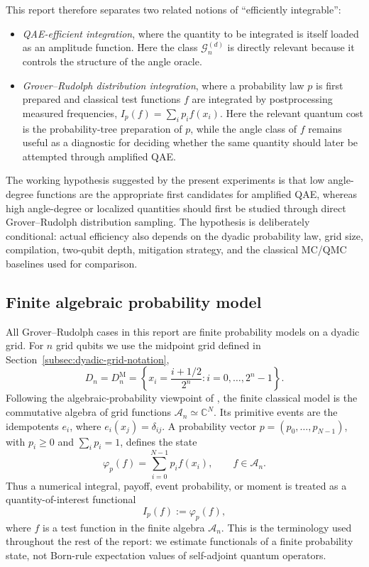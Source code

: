 This report therefore separates two related notions of ``efficiently
integrable'':
\begin{itemize}[leftmargin=*]
  \item \emph{QAE-efficient integration}, where the quantity to be integrated
        is itself loaded as an amplitude function. Here the class
        \(\mathcal{G}^{(d)}_n\) is directly relevant because it controls the
        structure of the angle oracle.
  \item \emph{Grover--Rudolph distribution integration}, where a probability
        law \(p\) is first prepared and classical test functions \(f\) are
        integrated by postprocessing measured frequencies,
        \(I_p(f)=\sum_i p_i f(x_i)\). Here the relevant quantum cost is the
        probability-tree preparation of \(p\), while the angle class of \(f\)
        remains useful as a diagnostic for deciding whether the same quantity
        should later be attempted through amplified QAE.
\end{itemize}

The working hypothesis suggested by the present experiments is that low
angle-degree functions are the appropriate first candidates for amplified QAE,
whereas high angle-degree or localized quantities should first be studied
through direct Grover--Rudolph distribution sampling. The hypothesis is
deliberately conditional: actual efficiency also depends on the dyadic
probability law, grid size, compilation, two-qubit depth, mitigation strategy,
and the classical MC/QMC baselines used for comparison.

\subsection{Finite algebraic probability model}
\label{subsec:algebraic-probability-model}

All Grover--Rudolph cases in this report are finite probability models on a
dyadic grid. For \(n\) grid qubits we use the midpoint grid defined in
Section~\ref{subsec:dyadic-grid-notation},
\[
  D_n=D_n^{\mathrm{M}}
  =
  \left\{x_i=\frac{i+1/2}{2^n}: i=0,\ldots,2^n-1\right\}.
\]
Following the algebraic-probability viewpoint of
\cite{falco2026algebraicprobability}, the finite classical model is the
commutative algebra of grid functions
\(\mathcal{A}_n\simeq\mathbb{C}^N\). Its primitive events are the idempotents
\(e_i\), where \(e_i(x_j)=\delta_{ij}\). A probability vector
\(p=(p_0,\ldots,p_{N-1})\), with \(p_i\ge 0\) and \(\sum_i p_i=1\), defines the
state
\[
  \varphi_p(f)=\sum_{i=0}^{N-1}p_i f(x_i),
  \qquad f\in\mathcal{A}_n.
\]
Thus a numerical integral, payoff, event probability, or moment is treated as a
quantity-of-interest functional
\[
  I_p(f):=\varphi_p(f),
\]
where \(f\) is a test function in the finite algebra \(\mathcal{A}_n\). This is
the terminology used throughout the rest of the report: we estimate
functionals of a finite probability state, not Born-rule expectation values of
self-adjoint quantum operators.

